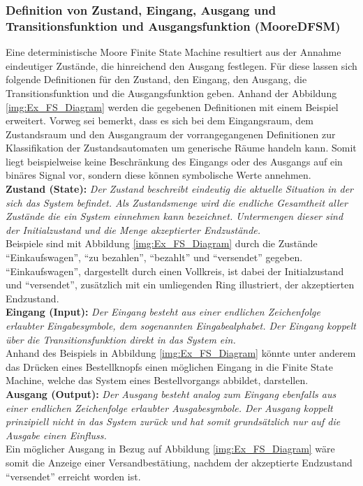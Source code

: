 \subsubsection{Definition von Zustand, Eingang, Ausgang und Transitionsfunktion und Ausgangsfunktion (MooreDFSM)}
\label{subsubsec:DefSIOT}
Eine  deterministische Moore Finite State Machine resultiert aus der Annahme eindeutiger Zustände, die hinreichend den Ausgang festlegen. Für diese lassen sich folgende Definitionen %
für den Zustand, den Eingang, den Ausgang, die Transitionsfunktion und die Ausgangsfunktion geben. Anhand der Abbildung \ref{img:Ex_FS_Diagram} werden die gegebenen Definitionen mit einem Beispiel erweitert. Vorweg sei bemerkt, dass es sich bei dem Eingangsraum, dem Zustandsraum und den Ausgangraum der vorrangegangenen Definitionen zur Klassifikation der Zustandsautomaten um generische Räume handeln kann. Somit liegt beispielweise keine Beschränkung des Eingangs oder des Ausgangs auf ein binäres Signal vor, sondern diese können symbolische Werte annehmen. \\

\textbf{Zustand (State):} \textit{Der Zustand beschreibt eindeutig die aktuelle Situation in der sich das System befindet. Als Zustandsmenge wird die endliche Gesamtheit aller Zustände die ein System einnehmen kann bezeichnet. Untermengen dieser sind der Initialzustand und die Menge akzeptierter Endzustände.}\\
Beispiele sind mit Abbildung \ref{img:Ex_FS_Diagram} durch die Zustände "`Einkaufswagen"', "`zu bezahlen"', "`bezahlt"' und "`versendet"' gegeben. "`Einkaufswagen"', dargestellt durch einen Vollkreis, ist dabei der Initialzustand und "`versendet"', zusätzlich mit ein umliegenden Ring illustriert, der akzeptierten Endzustand.\\

\textbf{Eingang (Input):} \textit{Der Eingang besteht aus einer endlichen Zeichenfolge erlaubter Eingabesymbole, dem sogenannten Eingabealphabet. Der Eingang koppelt über die Transitionsfunktion direkt in das System ein.}\\
Anhand des Beispiels in Abbildung \ref{img:Ex_FS_Diagram} könnte unter anderem das Drücken eines Bestellknopfs einen möglichen Eingang in die Finite State Machine, welche das System eines Bestellvorgangs abbildet, darstellen.\\


\textbf{Ausgang (Output):} \textit{ Der Ausgang besteht analog zum Eingang ebenfalls aus einer endlichen Zeichenfolge erlaubter Ausgabesymbole. Der Ausgang koppelt prinzipiell nicht in das System zurück und hat somit grundsätzlich nur auf die Ausgabe einen Einfluss.}\\
Ein möglicher Ausgang in Bezug auf Abbildung \ref{img:Ex_FS_Diagram} wäre somit die Anzeige einer Versandbestätiung, nachdem der akzeptierte Endzustand "`versendet"' erreicht worden ist.\\

